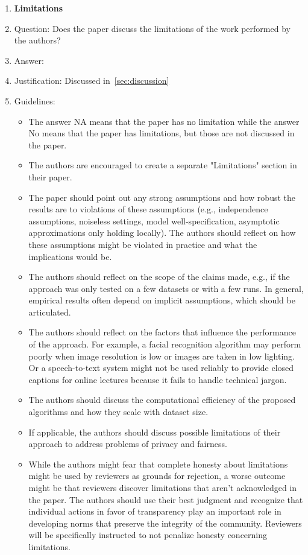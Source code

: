 \documentclass{article}
\begin{document}
{\begin{enumerate}
\item {\bf Limitations}
    \item[] Question: Does the paper discuss the limitations of the work performed by the authors?
    \item[] Answer: \answerYes{} %
    \item[] Justification: Discussed in~\cref{sec:discussion}
    \item[] Guidelines:
    \begin{itemize}
        \item The answer NA means that the paper has no limitation while the answer No means that the paper has limitations, but those are not discussed in the paper.
        \item The authors are encouraged to create a separate "Limitations" section in their paper.
        \item The paper should point out any strong assumptions and how robust the results are to violations of these assumptions (e.g., independence assumptions, noiseless settings, model well-specification, asymptotic approximations only holding locally). The authors should reflect on how these assumptions might be violated in practice and what the implications would be.
        \item The authors should reflect on the scope of the claims made, e.g., if the approach was only tested on a few datasets or with a few runs. In general, empirical results often depend on implicit assumptions, which should be articulated.
        \item The authors should reflect on the factors that influence the performance of the approach. For example, a facial recognition algorithm may perform poorly when image resolution is low or images are taken in low lighting. Or a speech-to-text system might not be used reliably to provide closed captions for online lectures because it fails to handle technical jargon.
        \item The authors should discuss the computational efficiency of the proposed algorithms and how they scale with dataset size.
        \item If applicable, the authors should discuss possible limitations of their approach to address problems of privacy and fairness.
        \item While the authors might fear that complete honesty about limitations might be used by reviewers as grounds for rejection, a worse outcome might be that reviewers discover limitations that aren't acknowledged in the paper. The authors should use their best judgment and recognize that individual actions in favor of transparency play an important role in developing norms that preserve the integrity of the community. Reviewers will be specifically instructed to not penalize honesty concerning limitations.
    \end{itemize}


\end{enumerate}}
\end{document}
